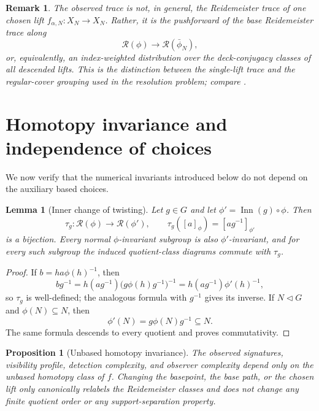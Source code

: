 \documentclass[11pt]{article}
\newtheorem{proposition}[theorem]{Proposition}
\newtheorem{lemma}[theorem]{Lemma}
\newtheorem{remark}[theorem]{Remark}
\DeclareMathOperator{\Inn}{Inn}
\newcommand{\RN}{\mathcal R}
\begin{document}
\begin{remark}
The observed trace is not, in general, the Reidemeister trace of one chosen
lift $f_{\alpha,N}\colon X_N\to X_N$.  Rather, it is the pushforward of the
base Reidemeister trace along
\[
  \RN(\phi)\longrightarrow\RN(\bar\phi_N),
\]
or, equivalently, an index-weighted distribution over the deck-conjugacy
classes of all descended lifts.  This is the distinction between the
single-lift trace and the regular-cover grouping used in the resolution
problem; compare \cite[Section~6.7]{Ponto}.
\end{remark}

\section{Homotopy invariance and independence of choices}
\label{sec:invariance}

We now verify that the numerical invariants introduced below do not depend on
the auxiliary based choices.

\begin{lemma}[Inner change of twisting]
\label{lem:innerchange}
Let $g\in G$ and let $\phi'=\Inn(g)\circ\phi$.  Then
\[
  \tau_g\colon\RN(\phi)\longrightarrow\RN(\phi'),
  \qquad
  \tau_g([a]_\phi)=[a g^{-1}]_{\phi'}
\]
is a bijection.  Every normal $\phi$-invariant subgroup is also
$\phi'$-invariant, and for every such subgroup the induced quotient-class
diagrams commute with $\tau_g$.
\end{lemma}

\begin{proof}
If $b=h a\phi(h)^{-1}$, then
\[
  b g^{-1}
  =h(a g^{-1})\bigl(g\phi(h)g^{-1}\bigr)^{-1}
  =h(a g^{-1})\phi'(h)^{-1},
\]
so $\tau_g$ is well-defined; the analogous formula with $g^{-1}$ gives its
inverse.  If $N\triangleleft G$ and $\phi(N)\subseteq N$, then
\[
  \phi'(N)=g\phi(N)g^{-1}\subseteq N.
\]
The same formula descends to every quotient and proves commutativity.
\end{proof}

\begin{proposition}[Unbased homotopy invariance]
\label{prop:homotopyinvariance}
The observed signatures, visibility profile, detection complexity, and
observer complexity depend only on the unbased homotopy class of $f$.
Changing the basepoint, the base path, or the chosen lift only canonically
relabels the Reidemeister classes and does not change any finite quotient
order or any support-separation property.
\end{proposition}
\end{document}
